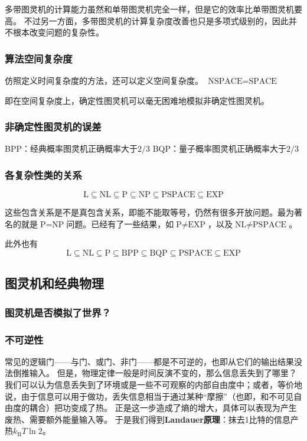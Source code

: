 \documentclass[UTF8, a4paper]{ctexart}
\begin{document}
多带图灵机的计算能力虽然和单带图灵机完全一样，但是它的效率比单带图灵机要高。
不过另一方面，多带图灵机的计算复杂度改善也只是多项式级别的，因此并不根本改变问题的复杂性。

\subsubsection{算法空间复杂度}

仿照定义时间复杂度的方法，还可以定义空间复杂度。
$\text{NSPACE}=\text{SPACE}$

即在空间复杂度上，确定性图灵机可以毫无困难地模拟非确定性图灵机。

\subsubsection{非确定性图灵机的误差}

BPP：经典概率图灵机正确概率大于$2/3$
BQP：量子概率图灵机正确概率大于$2/3$

\subsubsection{各复杂性类的关系}

\[
    \text{L} \subseteq \text{NL} \subseteq \text{P} \subseteq \text{NP} \subseteq \text{PSPACE} \subseteq \text{EXP}
\]

这些包含关系是不是真包含关系，即能不能取等号，仍然有很多开放问题。最为著名的就是$\text{P}=\text{NP}$问题。已经有了一些结果，如$\text{P} \neq \text{EXP}$，以及$\text{NL} \neq \text{PSPACE}$。

此外也有
\[
    \text{L} \subseteq \text{NL} \subseteq \text{P} \subseteq \text{BPP} \subseteq \text{BQP} \subseteq \text{PSPACE} \subseteq \text{EXP}
\]

\subsection{图灵机和经典物理}

\subsubsection{图灵机是否模拟了世界？}

\subsubsection{不可逆性}

常见的逻辑门——与门、或门、非门——都是不可逆的，也即从它们的输出结果没法倒推输入。
但是，物理定律一般是时间反演不变的，那么信息丢失到了哪里？我们可以认为信息丢失到了环境或是一些不可观察的内部自由度中；或者，等价地说，由于信息可以用于做功，丢失信息相当于通过某种“摩擦”（也即，和不可见自由度的耦合）把功变成了热。
正是这一步造成了熵的增大，具体可以表现为产生废热、需要额外能量输入等。
于是我们得到\textbf{Landauer原理}：抹去1比特的信息产热$k_\text{B} T \ln 2$。
\end{document}
